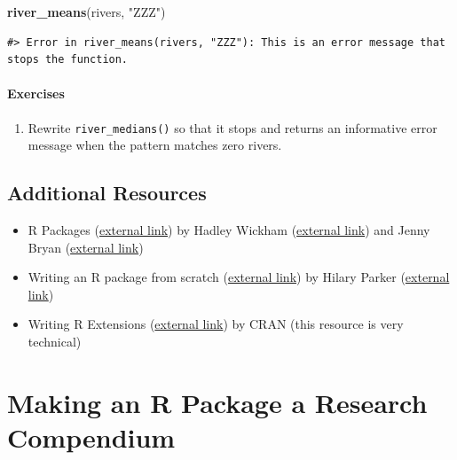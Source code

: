 \documentclass[
]{book}
\newenvironment{Shaded}{\begin{snugshade}}{\end{snugshade}}
\newcommand{\KeywordTok}[1]{\textcolor[rgb]{0.13,0.29,0.53}{\textbf{#1}}}
\newcommand{\NormalTok}[1]{#1}
\newcommand{\StringTok}[1]{\textcolor[rgb]{0.31,0.60,0.02}{#1}}
\providecommand{\tightlist}{%
  \setlength{\itemsep}{0pt}\setlength{\parskip}{0pt}}
\begin{document}
\begin{Shaded}
\begin{Highlighting}[]
\KeywordTok{river_means}\NormalTok{(rivers, }\StringTok{"ZZZ"}\NormalTok{)}
\end{Highlighting}
\end{Shaded}

\begin{verbatim}
#> Error in river_means(rivers, "ZZZ"): This is an error message that stops the function.
\end{verbatim}

\hypertarget{ex-set6}{%
\subsubsection{Exercises}\label{ex-set6}}

\begin{enumerate}
\def\labelenumi{\arabic{enumi}.}
\tightlist
\item
  Rewrite \texttt{river\_medians()} so that it stops and returns an informative error message when the pattern matches zero rivers.
\end{enumerate}

\hypertarget{add-resources}{%
\section{Additional Resources}\label{add-resources}}

\begin{itemize}
\tightlist
\item
  R Packages (\href{https://r-pkgs.org/index.html}{external link}) by Hadley Wickham (\href{http://hadley.nz/}{external link}) and Jenny Bryan (\href{https://jennybryan.org/}{external link}) \citep{wickham2015r}
\item
  Writing an R package from scratch (\href{https://hilaryparker.com/2014/04/29/writing-an-r-package-from-scratch/}{external link}) by Hilary Parker (\href{https://hilaryparker.com/}{external link})
\item
  Writing R Extensions (\href{https://cran.r-project.org/doc/manuals/r-release/R-exts.html}{external link}) by CRAN (this resource is very technical)
\end{itemize}

\hypertarget{r-package-rc}{%
\chapter{Making an R Package a Research Compendium}\label{r-package-rc}}
\end{document}
